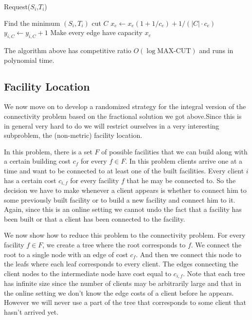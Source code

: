\begin{algorithm}
\caption{Request($S_i$,$T_i$)}
\begin{algorithmic}[1]
  \STATE Find the minimum  $(S_i,T_i)$ cut $C$
    \STATE $x_e \leftarrow x_e (1 + 1/c_e) + 1/(|C| \cdot c_e)$ 
  \ENDFOR
  \STATE $y_{i,C} \leftarrow y_{i,C} + 1$
\ENDWHILE
\STATE Make every edge have capacity $x_e$ 
\end{algorithmic}
\end{algorithm}

The algorithm above has competitive ratio $O( \log \textrm{MAX-CUT} )$ and runs in polynomial time.

\subsection{Facility Location}
We now move on to develop a randomized strategy for the integral version of the connectivity problem based on the fractional solution we got above.Since this is in general very hard to do we will restrict ourselves in a very interesting subproblem, the (non-metric) facility location.

In this problem, there is a set $F$ of possible facilities that we can build along with a certain building cost $c_f$ for every $f \in F$. In this problem clients arrive one at a time and want to be connected to at least one of the built facilities. Every client $i$ has a certain cost $c_{i,f}$ for every facility $f$ that he may be connected to. So the decision we have to make whenever a client appears is whether to connect him to some previously built facility or to build a new facility and connect him to it. Again, since this is an online setting we cannot undo the fact that a facility has been built or that a client has been connected to the facility.

We now show how to reduce this problem to the connectivity problem. For every facility $f \in F$, we create a tree where the root corresponds to $f$. We connect the root to a single node with an edge of cost $c_f$. And then we connect this node to the leafs where each leaf corresponds to every client. The edges connecting the client nodes to the intermediate node have cost equal to $c_{i,f}$. Note that each tree has infinite size since the number of clients may be arbitrarily large and that in the online setting we don't know the edge costs of a client before he appears. However we will never use a part of the tree that corresponds to some client that hasn't arrived yet.

